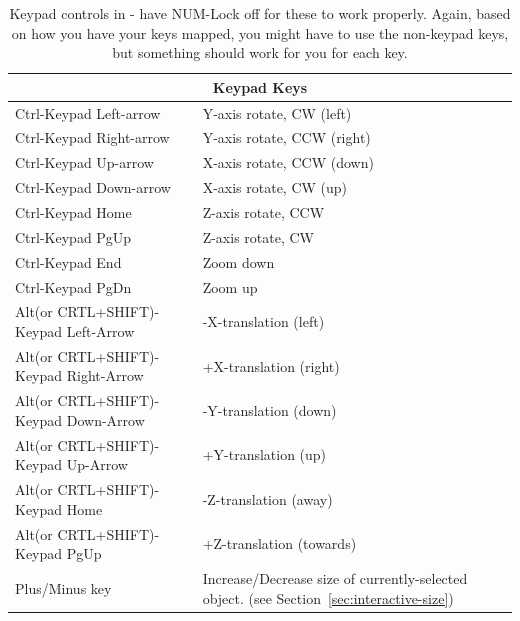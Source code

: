 \begin{table}[htbp]
    \caption{\label{table:keypad}
      Keypad controls in \map{} - have NUM-Lock off for these to work
      properly.  Again, based on how you have your keys mapped, you might
      have to use the non-keypad keys, but something should work for you
      for each key.}
\begin{center}

\begin{tabular}{|l|p{3in}|} \hline
        \multicolumn{2}{|c||}{\textbf{Keypad Keys}} \\ \hline
   Ctrl-Keypad Left-arrow  &  Y-axis rotate, CW (left)  \\ \hline
   Ctrl-Keypad Right-arrow  &  Y-axis rotate, CCW (right)\\ \hline
   Ctrl-Keypad Up-arrow  &  X-axis rotate, CCW (down) \\ \hline
   Ctrl-Keypad Down-arrow  &  X-axis rotate, CW (up) \\ \hline
   Ctrl-Keypad Home  &  Z-axis rotate, CCW  \\ \hline
   Ctrl-Keypad PgUp  &  Z-axis rotate, CW  \\ \hline
   Ctrl-Keypad End  &  Zoom down  \\ \hline
   Ctrl-Keypad PgDn  &  Zoom up  \\ \hline
    Alt(or CRTL+SHIFT)-Keypad Left-Arrow  &  -X-translation (left) \\ \hline 
    Alt(or CRTL+SHIFT)-Keypad Right-Arrow  &  +X-translation (right)\\ \hline
    Alt(or CRTL+SHIFT)-Keypad Down-Arrow  &  -Y-translation (down) \\ \hline
    Alt(or CRTL+SHIFT)-Keypad Up-Arrow  &  +Y-translation (up) \\ \hline
    Alt(or CRTL+SHIFT)-Keypad Home  &  -Z-translation (away) \\ \hline
    Alt(or CRTL+SHIFT)-Keypad PgUp  &  +Z-translation (towards)  \\ \hline
        Plus/Minus key  & Increase/Decrease size of
    currently-selected object. (see Section~\ref{sec:interactive-size})\\
\hline
\end{tabular}
\end{center}
\end{table}
\clearpage



